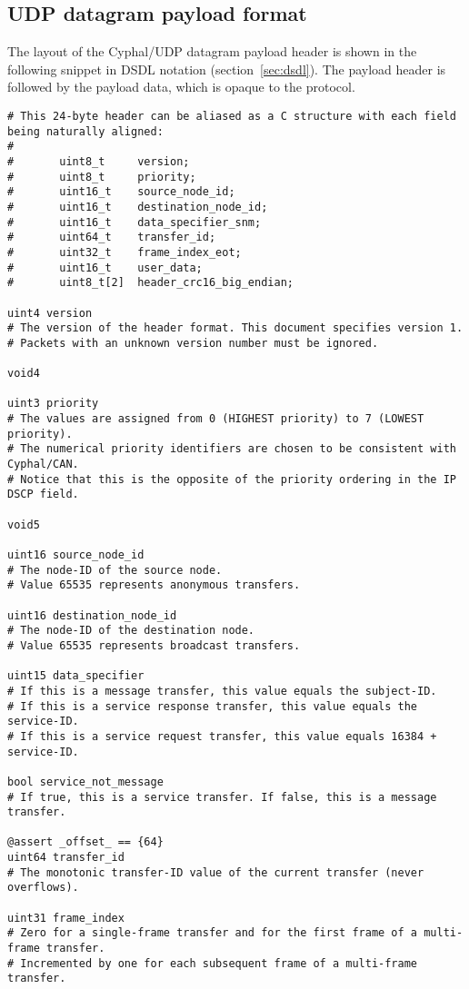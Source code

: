 \subsection{UDP datagram payload format}

The layout of the Cyphal/UDP datagram payload header is shown in the following snippet in DSDL notation
(section~\ref{sec:dsdl}).
The payload header is followed by the payload data, which is opaque to the protocol.

\begin{samepage}
\begin{verbatim}
# This 24-byte header can be aliased as a C structure with each field being naturally aligned:
#
#       uint8_t     version;
#       uint8_t     priority;
#       uint16_t    source_node_id;
#       uint16_t    destination_node_id;
#       uint16_t    data_specifier_snm;
#       uint64_t    transfer_id;
#       uint32_t    frame_index_eot;
#       uint16_t    user_data;
#       uint8_t[2]  header_crc16_big_endian;

uint4 version
# The version of the header format. This document specifies version 1.
# Packets with an unknown version number must be ignored.

void4

uint3 priority
# The values are assigned from 0 (HIGHEST priority) to 7 (LOWEST priority).
# The numerical priority identifiers are chosen to be consistent with Cyphal/CAN.
# Notice that this is the opposite of the priority ordering in the IP DSCP field.

void5

uint16 source_node_id
# The node-ID of the source node.
# Value 65535 represents anonymous transfers.

uint16 destination_node_id
# The node-ID of the destination node.
# Value 65535 represents broadcast transfers.

uint15 data_specifier
# If this is a message transfer, this value equals the subject-ID.
# If this is a service response transfer, this value equals the service-ID.
# If this is a service request transfer, this value equals 16384 + service-ID.

bool service_not_message
# If true, this is a service transfer. If false, this is a message transfer.

@assert _offset_ == {64}
uint64 transfer_id
# The monotonic transfer-ID value of the current transfer (never overflows).

uint31 frame_index
# Zero for a single-frame transfer and for the first frame of a multi-frame transfer.
# Incremented by one for each subsequent frame of a multi-frame transfer.


\end{verbatim}
\end{samepage}
